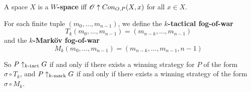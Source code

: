 \begin{definition}
  A space $X$ is a \textbf{$W$-space} iff $\mathscr{O}\uparrow Con_{O,P}(X,x)$ for all $x\in X$.
\end{definition}








\begin{definition}
  For each finite tuple $(m_0,\dots,m_{n-1})$, we define the \textbf{$k$-tactical fog-of-war}
    \[
      T_k(m_0,\dots,m_{n-1})=(m_{n-k},\dots,m_{n-1})
    \]
  and the \textbf{$k$-Mark\"ov fog-of-war}
    \[
      M_k(m_0,\dots,m_{n-1})=(m_{n-k},\dots,m_{n-1},n-1)
    \]

  So $P\uparrow_{k\text{-tact}}G$ if and only if there exists a winning strategy for $P$ of the form $\sigma\circ T_k$, and $P\uparrow_{k\text{-mark}}G$ if and only if there exists a winning strategy of the form $\sigma\circ M_k$.
\end{definition}

